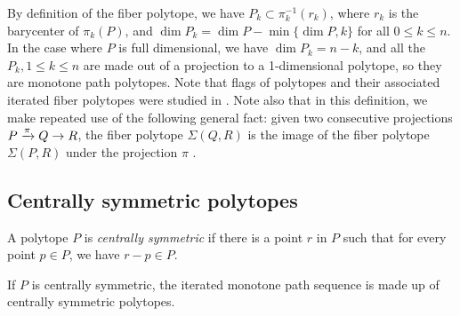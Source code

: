 By definition of the fiber polytope, we have $P_k \subset \pi_k^{-1}(r_k)$, where $r_k$ is the barycenter of $\pi_k(P)$, and $\dim P_k = \dim P - \min\{ \dim P,k\}$ for all $0\leq k \leq n$.
In the case where $P$ is full dimensional, we have $\dim P_k = n-k$, and all the $P_k, 1 \leq k \leq n$ are made out of a projection to a 1-dimensional polytope, so they are monotone path polytopes.
Note that flags of polytopes and their associated iterated fiber polytopes were studied in \cite{BilleraSturmfels94}.
Note also that in this definition, we make repeated use of the following general fact: given two consecutive projections $P \xrightarrow{\pi} Q \to R$, the fiber polytope $\Sigma(Q,R)$ is the image of the fiber polytope $\Sigma(P,R)$ under the projection $\pi$ \cite[Lemma 2.3]{BilleraSturmfels92}.





\subsection{Centrally symmetric polytopes} \label{ss:centrally-symmetric}

A polytope $P$ is \emph{centrally symmetric} if there is a point $r$ in $P$ such that for every point $p \in P$, we have $r-p \in P$.

\begin{lemma}
	\label{l:centrally-symmetric}
	If $P$ is centrally symmetric, the iterated monotone path sequence is made up of centrally symmetric polytopes. 
\end{lemma}

